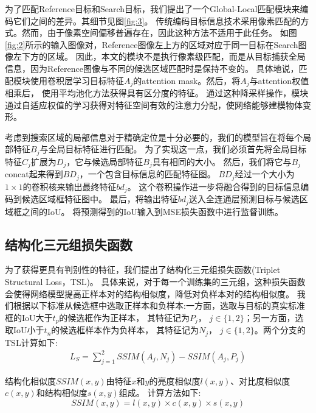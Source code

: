 \documentclass[promaster]{thesis-uestc}
\begin{document}
为了匹配Reference目标和Search目标，我们提出了一个Global-Local匹配模块来编码它们之间的差异。其细节见图\ref{fig:3}。
传统编码目标信息技术采用像素匹配的方式。然而，由于像素空间偏移普遍存在，因此这种方法不适用于此任务。
如图\ref{fig:2}所示的输入图像对，Reference图像左上方的区域对应于同一目标在Search图像左下方的区域。
因此，本文的模块不是执行像素级匹配，而是从目标捕获全局信息，因为Reference图像与不同的候选区域匹配时是保持不变的。
具体地说，匹配模块使用卷积层学习目标特征$A_{j}$的attention mask。然后，将$A_{j}$与attention权值相乘后，
使用平均池化方法获得具有区分度的特征。
通过这种降采样操作，模块通过自适应权值的学习获得对特征空间有效的注意力分配，使网络能够建模物体变形。

考虑到搜索区域的局部信息对于精确定位是十分必要的，我们的模型旨在将每个局部特征$B_{j}$与全局目标特征进行匹配。
为了实现这一点，我们必须首先将全局目标特征$C_{j}$扩展为$D_{j}$，它与候选局部特征$B_{j}$具有相同的大小。
然后，我们将它与$B_{j}$concat起来得到$BD_{j}$，一个包含目标信息的匹配特征图。
$BD_{j}$经过一个大小为$1 \times1$的卷积核来输出最终特征$bd_{j}$。
这个卷积操作进一步将融合得到的目标信息编码到候选区域框特征图中。
最后，将输出特征$bd_{j}$送入全连通层预测目标与候选区域框之间的IoU。
将预测得到的IoU输入到MSE损失函数中进行监督训练。


\subsection{结构化三元组损失函数}
\label{loss}

为了获得更具有判别性的特征，我们提出了结构化三元组损失函数(Triplet Structural Loss，TSL)。
具体来说，对于每一个训练集的三元组，这种损失函数会使得网络模型提高正样本对的结构相似度，降低对负样本对的结构相似度。
我们根据以下标准从候选框中选取正样本和负样本:一方面，选取与目标的真实标准框的IoU大于$t_{p}$的候选框作为正样本，
其特征记为$P_{j}$， $j \in \{1,2\}$；另一方面，选取IoU小于$t_{n}$的候选框样本作为负样本，
其特征记为$N_{j}$， $j \in \{1,2\}$。两个分支的TSL计算如下:
\begin{equation}
    \begin{aligned}
    L_{S}  = \sum_{j=1}^{2} SSIM(A_{j},N_{j}) 
        - SSIM(A_{j},P_{j})  
    \end{aligned}
    \label{Eq.6}
\end{equation}

结构化相似度$SSIM(x, y)$由特征$x$和$y$的亮度相似度$l(x, y)$、对比度相似度$c(x, y)$和结构相似度$s(x, y)$组成。
计算方法如下:
\begin{equation}
    SSIM(x, y)= l(x,y) \times c(x,y) \times s(x,y) 
    \label{Eq.1}
\end{equation}
\end{document}
